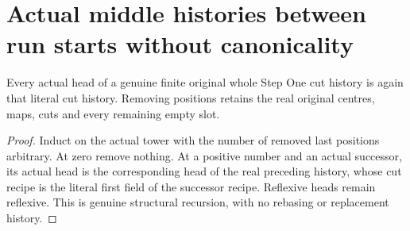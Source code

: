 \section{Actual middle histories between run starts without canonicality}

\begin{lemma}
\label{hir:original-finite-stepone-cut-head-recipe}
\leanok
Every actual head of a genuine finite original whole Step One cut history
is again that literal cut history. Removing positions retains the real
original centres, maps, cuts and every remaining empty slot.
\end{lemma}
\begin{proof}
Induct on the actual tower with the number of removed last positions
arbitrary. At zero remove nothing. At a positive number and an actual
successor, its actual head is the corresponding head of the real preceding
history, whose cut recipe is the literal first field of the successor
recipe. Reflexive heads remain reflexive. This is genuine structural
recursion, with no rebasing or replacement history.
\end{proof}

